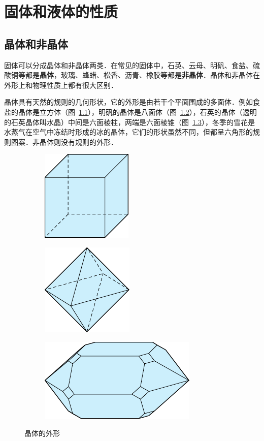 \chapter{固体和液体的性质}\label{chapter-properties-of-solids-and-liquids}

\section{晶体和非晶体}
固体可以分成晶体和非晶体两类．在常见的固体中，石英、云母、明矾、食盐、硫酸铜等都是\textbf{晶体}，玻璃、蜂蜡、松香、沥青、橡胶等都是\textbf{非晶体}．晶体和非晶体在外形上和物理性质上都有很大区别．

晶体具有天然的规则的几何形状，它的外形是由若干个平面围成的多面体．例如食盐的晶体是立方体（图~\ref{fig_B_4-1a}），明矾的晶体是八面体（图~\ref{fig_B_4-1b}），石英的晶体（透明的石英晶体叫水晶）中间是六面棱柱，两端是六面棱锥（图~\ref{fig_B_4-1c}），冬季的雪花是水蒸气在空气中冻结时形成的冰的晶体，它们的形状虽然不同，但都呈六角形的规则图案．非晶体则没有规则的外形．
\begin{figure}[htbp]
    \centering
    \begin{subfigure}{0.3\linewidth}
        \centering
        \includegraphics{fig/B/4-1a.pdf}
        \caption{}\label{fig_B_4-1a}
    \end{subfigure}
    \hfil
    \begin{subfigure}{0.3\linewidth}
        \centering
        \includegraphics{fig/B/4-1b.pdf}
        \caption{}\label{fig_B_4-1b}
    \end{subfigure}
    \hfil
    \begin{subfigure}{0.3\linewidth}
        \centering
        \includegraphics{fig/B/4-1c.pdf}
        \caption{}\label{fig_B_4-1c}
    \end{subfigure}
    \caption{晶体的外形}\label{fig_B_4-1}
\end{figure}


